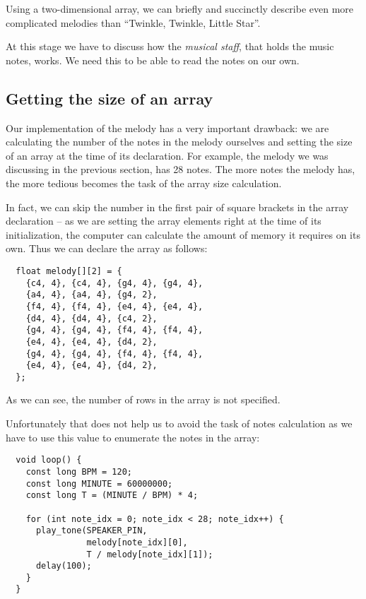 \documentclass[../sparc.tex]{subfiles}
\begin{document}
Using a two-dimensional array, we can briefly and succinctly describe even more
complicated melodies than ``Twinkle, Twinkle, Little Star''.

At this stage we have to discuss how the \emph{musical staff}, that holds the
music notes, works.  We need this to be able to read the notes on our own.

\subsection{Getting the size of an array}

Our implementation of the melody has a very important drawback: we are
calculating the number of the notes in the melody ourselves and setting the size
of an array at the time of its declaration.  For example, the melody we was
discussing in the previous section, has 28 notes.  The more notes the melody
has, the more tedious becomes the task of the array size calculation.

In fact, we can skip the number in the first pair of square brackets in the
array declaration -- as we are setting the array elements right at the time of
its initialization, the computer can calculate the amount of memory it requires
on its own.  Thus we can declare the array as follows:

\begin{verbatim}
  float melody[][2] = {
    {c4, 4}, {c4, 4}, {g4, 4}, {g4, 4},
    {a4, 4}, {a4, 4}, {g4, 2},
    {f4, 4}, {f4, 4}, {e4, 4}, {e4, 4},
    {d4, 4}, {d4, 4}, {c4, 2},
    {g4, 4}, {g4, 4}, {f4, 4}, {f4, 4},
    {e4, 4}, {e4, 4}, {d4, 2},
    {g4, 4}, {g4, 4}, {f4, 4}, {f4, 4},
    {e4, 4}, {e4, 4}, {d4, 2},
  };
\end{verbatim}

As we can see, the number of rows in the array is not specified.

Unfortunately that does not help us to avoid the task of notes calculation as we
have to use this value to enumerate the notes in the array:

\begin{verbatim}
  void loop() {
    const long BPM = 120;
    const long MINUTE = 60000000;
    const long T = (MINUTE / BPM) * 4;

    for (int note_idx = 0; note_idx < 28; note_idx++) {
      play_tone(SPEAKER_PIN,
                melody[note_idx][0],
                T / melody[note_idx][1]);
      delay(100);
    }
  }
\end{verbatim}
\end{document}
